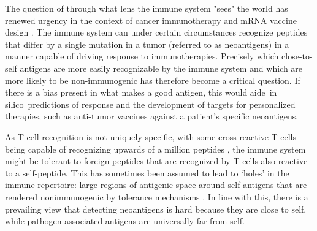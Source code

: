 \documentclass[superscriptaddress,twocolumn,pre]{revtex4}
\newcommand{\<}{\langle}
\renewcommand{\>}{\rangle}
\begin{document}
The question of through what lens the immune system "sees" the world has renewed urgency in the context of cancer immunotherapy and mRNA vaccine design \cite{Luksza2017,Balachandran2017,Richman2019}. The immune system can under certain circumstances recognize peptides that differ by a single mutation in a tumor (referred to as neoantigens) in a manner capable of driving response to immunotherapies. Precisely which close-to-self antigens are more easily recognizable by the immune system and which are more likely to be non-immunogenic has therefore become a critical question. If there is a bias present in what makes a good antigen, this would aide in silico predictions of response and the development of targets for personalized therapies, such as anti-tumor vaccines against a patient's specific neoantigens.

As T cell recognition is not uniquely specific, with some cross-reactive T cells being capable of recognizing upwards of a million peptides \cite{Wooldridge2012}, the immune system might be tolerant to foreign peptides that are recognized by T cells also reactive to a self-peptide. This has sometimes been assumed to lead to ‘holes’ in the immune repertoire: large regions of antigenic space around self-antigens that are rendered nonimmunogenic by tolerance mechanisms \cite{Calis2012a}. In line with this, there is a prevailing view that detecting neoantigens is hard because they are close to self, while pathogen-associated antigens are universally far from self.
\end{document}
